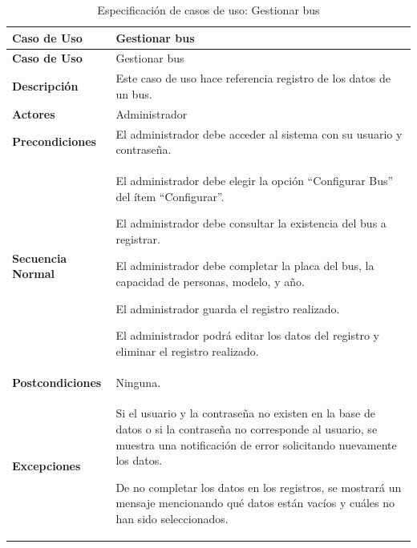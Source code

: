 	\begingroup
	\onehalfspacing
	
	\begin{longtable}{m{4cm} m{10.5cm}}
		\caption[Especificación de casos de uso: Gestionar bus]{\newline Especificación de casos de uso: Gestionar bus} \label{tab:tabla3_3}\\
		\toprule
		\textbf{Caso de Uso} & Gestionar bus \\
		\midrule
		\endfirsthead
		
		\toprule
		\textbf{Caso de Uso} & Gestionar bus \\
		\endhead
		
		
		\bottomrule
		\endlastfoot
		
		\textbf{Descripción} & Este caso de uso hace referencia registro de los datos de un bus. \\ \hline
		\textbf{Actores} & Administrador \\ \hline
		\textbf{Precondiciones} & El administrador debe acceder al sistema con su usuario y contraseña. \\ \hline
		\textbf{Secuencia Normal} & El administrador debe elegir la opción “Configurar Bus” del ítem “Configurar”.
		
		El administrador debe consultar la existencia del bus a registrar.
		
		El administrador debe completar la placa del bus, la capacidad de personas, modelo, y año.
		
		El administrador guarda el registro realizado.
		
		El administrador podrá editar los datos del registro y eliminar el registro realizado. \\ \hline
		\textbf{Postcondiciones} & Ninguna.\\ \hline
		\textbf{Excepciones} & Si el usuario y la contraseña no existen en la base de datos o si la contraseña no corresponde al usuario, se muestra una notificación de error solicitando nuevamente los datos.
		
		De no completar los datos en los registros, se mostrará un mensaje mencionando qué datos están vacíos y cuáles no han sido seleccionados. \\
	\end{longtable}
	
